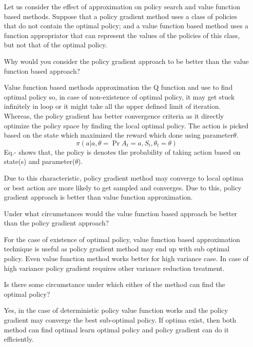 \documentclass[solution,addpoints,12pt]{exam}
\begin{document}
\begin{questions}
\begin{solution}
\end{solution}
\question[6]
 Let us consider the effect of approximation on policy search and value function based methods. Suppose that a policy gradient method uses a class of policies that do not contain the optimal policy; and a value function based method uses a function appropriator that can represent the values of the policies of this class, but not that of the optimal policy.
 \begin{enumerate}[label=(\alph*)]
     \question[2]  Why would you consider the policy gradient approach to be better than the value function based approach?
     \begin{solution}
		Value function based methods approximation the Q function and use to find optimal policy so, in case of non-existence of optimal policy, it may get stuck infinitely in loop or it might take all the upper defined limit of iteration. Whereas, the policy gradient has better convergence criteria as it directly optimize the policy space by finding the local optimal policy. The action is picked based on the state which maximized the reward which done using parameter$\theta$.
		\begin{equation}
			\pi(a|a,\theta = \Pr{A_t=a,S_t,\theta_t=\theta})
		\end{equation}
		Eq.- shows that, the policy is denotes the probability of taking action based on state(s) and parameter($\theta$).
		
		 Due to this characteristic, policy gradient method may converge to local optima or best action are more likely to get sampled and converges. Due to this, policy gradient approach is better than value function approximation. 
     
     \end{solution}
     \question[2]  Under what circumstances would the value function based approach be better than the policy gradient approach?
     \begin{solution}
     For the case of existence of optimal policy, value function based approximation technique is useful as policy gradient method may end up with sub optimal policy.  Even value function method works better for high variance case. In case of high variance policy gradient requires other variance reduction treatment.
     \end{solution}
     \question[2]  Is there some circumstance under which either of the method can find the optimal policy?
     \begin{solution}
     	Yes, in the case of deterministic policy value function works and the policy gradient may converge the best sub-optimal policy. If optima exist, then both method can find optimal learn optimal policy and policy gradient can do it efficiently.  
     \end{solution}
 

\end{enumerate}
\end{questions}
\end{document}
